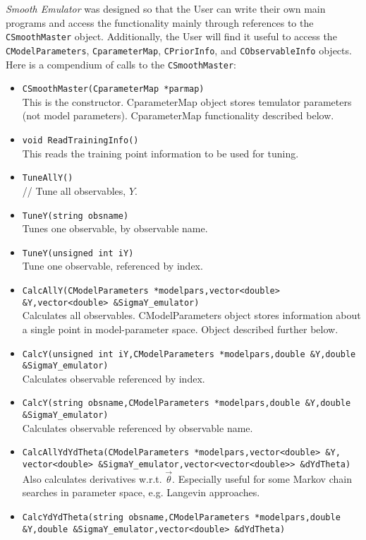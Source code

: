 \documentclass[UserManual.tex]{subfiles}
\begin{document}
{\it Smooth Emulator} was designed so that the User can write their own main programs and access the functionality mainly through references to the {\tt CSmoothMaster} object. Additionally, the User will find it useful to access the {\tt CModelParameters}, {\tt CparameterMap}, {\tt CPriorInfo}, and {\tt CObservableInfo} objects. Here is a compendium of calls to the {\tt CSmoothMaster}:
\begin{itemize}\itemsep=0pt
\item {\tt CSmoothMaster(CparameterMap *parmap)}\\
This is the constructor. CparameterMap object stores temulator parameters (not model parameters). CparameterMap functionality described below.
\item {\tt void ReadTrainingInfo()}\\
This reads the training point information to be used for tuning.
\item {\tt TuneAllY()}\\ //
Tune all observables, $Y$.
\item {\tt TuneY(string obsname)}\\
Tunes one observable, by observable name.
\item {\tt TuneY(unsigned int iY)}\\
Tune one observable, referenced by index.
\item {\tt CalcAllY(CModelParameters *modelpars,vector<double> \&Y,vector<double> \&SigmaY\_emulator)}\\
Calculates all observables. CModelParameters object stores information about a single point in model-parameter space. Object described further below.
\item {\tt CalcY(unsigned int iY,CModelParameters *modelpars,double \&Y,double \&SigmaY\_emulator)}\\
Calculates observable referenced by index.
\item {\tt CalcY(string obsname,CModelParameters *modelpars,double \&Y,double \&SigmaY\_emulator)}\\
Calculates observable referenced by observable name.
\item {\tt CalcAllYdYdTheta(CModelParameters *modelpars,vector<double> \&Y,
vector<double> \&SigmaY\_emulator,vector<vector<double>> \&dYdTheta)}\\
Also calculates derivatives w.r.t. $\vec{\theta}$. Especially useful for some Markov chain searches in parameter space, e.g. Langevin approaches.
\item {\tt CalcYdYdTheta(string obsname,CModelParameters *modelpars,double \&Y,double \&SigmaY\_emulator,vector<double> \&dYdTheta)}\\

\end{itemize}
\end{document}
